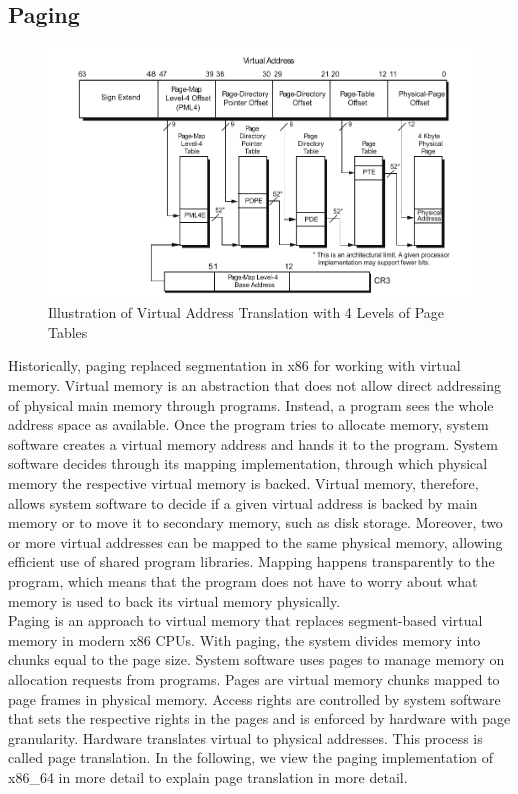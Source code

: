 \subsection{Paging}
\label{sec:state:technical:paging}
\begin{center}
    \begin{figure}
        \includegraphics[width=\textwidth]{images/paging_placeholder.png}
        \caption{Illustration of Virtual Address Translation with 4 Levels of Page Tables}
        \label{fig:state:technical:paging}
    \end{figure}
\end{center}

Historically, paging replaced segmentation in x86 for working with virtual
memory. Virtual memory is an abstraction that does not allow direct addressing
of physical main memory through programs. Instead, a program sees the whole
address space as available. Once the program tries to allocate memory, system
software creates a virtual memory address and hands it to the program. System
software decides through its mapping implementation, through which physical
memory the respective virtual memory is backed. Virtual memory, therefore,
allows system software to decide if a given virtual address is backed by main
memory or to move it to secondary memory, such as disk storage. Moreover, two or
more virtual addresses can be mapped to the same physical memory, allowing
efficient use of shared program libraries. Mapping happens transparently to the
program, which means that the program does not have to worry about what memory
is used to back its virtual memory physically.\\

Paging is an approach to virtual memory that replaces segment-based virtual
memory in modern x86 CPUs. With paging, the system divides memory into chunks
equal to the page size. System software uses pages to manage memory on
allocation requests from programs. Pages are virtual memory chunks mapped to
page frames in physical memory. Access rights are controlled by system software
that sets the respective rights in the pages and is enforced by hardware with
page granularity. Hardware translates virtual to physical addresses. This
process is called page translation. In the following, we view the paging
implementation of x86\_64 in more detail to explain page translation in more
detail.\\

